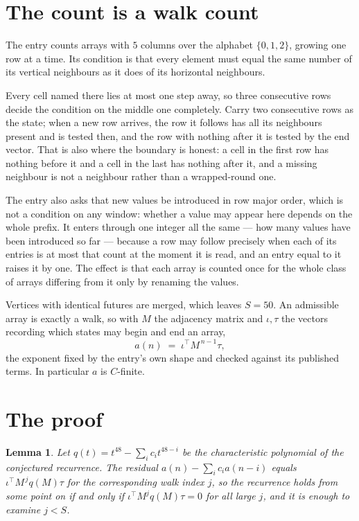 \documentclass[11pt,a4paper]{article}
\theoremstyle{plain}
\newtheorem{lemma}[theorem]{Lemma}
\theoremstyle{definition}
\begin{document}
\section{The count is a walk count}

The entry counts arrays with $5$ columns over the alphabet $\{0,1,2\}$, growing one row at a time. Its condition is that every element must equal the same number of its vertical neighbours as it does of its horizontal neighbours.

Every cell named there lies at most one step away, so three consecutive rows decide the condition on the middle one completely. Carry two consecutive rows as the state; when a new row arrives, the row it follows has all its neighbours present and is tested then, and the row with nothing after it is tested by the end vector. That is also where the boundary is honest: a cell in the first row has nothing before it and a cell in the last has nothing after it, and a missing neighbour is not a neighbour rather than a wrapped-round one.

The entry also asks that new values be introduced in row major order, which is not a condition on any window: whether a value may appear here depends on the whole prefix. It enters through one integer all the same --- how many values have been introduced so far --- because a row may follow precisely when each of its entries is at most that count at the moment it is read, and an entry equal to it raises it by one. The effect is that each array is counted once for the whole class of arrays differing from it only by renaming the values.

Vertices with identical futures are merged, which leaves $S=50$. An admissible array is exactly a walk, so with $M$ the adjacency matrix and $\iota,\tau$ the vectors recording which states may begin and end an array,
\[
a(n)\;=\;\iota^{\!\top}M^{\,n-1}\tau ,
\]
the exponent fixed by the entry's own shape and checked against its published terms. In
particular $a$ is $C$-finite.

\section{The proof}

\begin{lemma}\label{lem:crit}
Let $q(t)=t^{48}-\sum_i c_it^{48-i}$ be the characteristic polynomial of the
conjectured recurrence. The residual $a(n)-\sum_ic_ia(n-i)$ equals
$\iota^{\!\top}M^{\,j}q(M)\tau$ for the corresponding walk index $j$, so the recurrence
holds from some point on if and only if $\iota^{\!\top}M^{j}q(M)\tau=0$ for all large $j$,
and it is enough to examine $j<S$.
\end{lemma}
\end{document}
